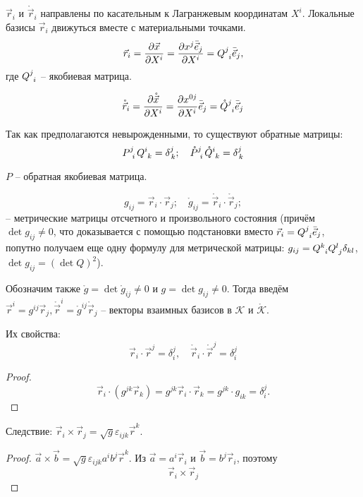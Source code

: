 $\vec{r}_i$ и $\mathring{\vec{r}}_i$ направлены по касательным к Лагранжевым координатам $X^i$. 
Локальные базисы $\vec{r}_i$ движуться вместе с материальными точками. 
\[
  \vec{r}_i
  = \dfrac{\partial \vec{x}}{\partial X^i}
  = \dfrac{\partial x^j \bar{\vec{e}}_j}{\partial X^i}  
  = \tensor{Q}{^j_i} \bar{\vec{e}}_j,
\]
где $\tensor{Q}{^j_i}$ -- якобиевая матрица.

\[
  \mathring{\vec{r}}_i = \dfrac{\partial \mathring{\vec{x}}}{\partial X^i}
  = \dfrac{\partial x^{0j}}{\partial X^i} \bar{\vec{e}}_j
  = \tensor{\mathring{Q}}{^j_i} \bar{\vec{e}}_j
\]

Так как предполагаются невырожденными, то существуют обратные матрицы:
\[
  \tensor{P}{^j_i} \tensor{Q}{^i_k} = \delta^j_{\, k}; \quad
  \tensor{\mathring{P}}{^j_i} \tensor{\mathring{Q}}{^i_k} = \delta^j_{\, k}
\]

$P$ -- обратная якобиевая матрица.

\[
  g_{ij} = \vec{r}_i \cdot \vec{r}_j; 
  \quad
  \mathring{g}_{ij} = \mathring{\vec{r}}_i \cdot \mathring{\vec{r}}_j;
\]
-- метрические матрицы отсчетного и произвольного состояния (причём $\det g_{ij} \neq 0$, что
доказывается с помощью подстановки вместо $\vec{r}_i = \tensor{Q}{^j_i} \bar{\vec{e}}_j$, попутно
получаем еще одну формулу для метрической матрицы: 
$g_{ij} = \tensor{Q}{^k_i} \tensor{Q}{^l_j} \delta_{kl}$, $\det g_{ij} = (\det Q )^2$).

Обозначим также $\mathring{g} = \det \mathring{g}_{ij} \neq 0$ и $g = \det g_{ij} \neq 0$.
Тогда введём $\vec{r}^i  = g^{ij} \vec{r}_j, \mathring{\vec{r}}^i = \mathring{g}^{ij}
\mathring{\vec{r}}_j$ --
векторы взаимных базисов в $\mathcal{K}$ и $\mathring{\mathcal{K}}$.

Их свойства:
\[
  \vec{r}_i \cdot \vec{r}^j = \delta^j_i, \quad \mathring{\vec{r}}_i \cdot \mathring{\vec{r}}^j = \delta^j_i
\]
\begin{proof}
  \[
    \vec{r}_i \cdot (g^{jk} \vec{r}_k)
    = g^{jk} \vec{r}_i \cdot \vec{r}_k
    = g^{jk} \cdot g_{ik} = \delta_i^j.
  \]
\end{proof}

Следствие: $\vec{r}_i \times \vec{r}_j = \sqrt{g} \varepsilon_{ijk} \vec{r}^k$.

\begin{proof}
  $\vec{a} \times \vec{b} = \sqrt{g} \varepsilon_{ijk} a^i b^j \vec{r}^k$.
  Из $\vec{a} = a^i \vec{r}_i$ и $\vec{b} = b^j \vec{r}_i$, поэтому 
  \[
    \vec{r}_i \times \vec{r}_j
  \]
\end{proof}

